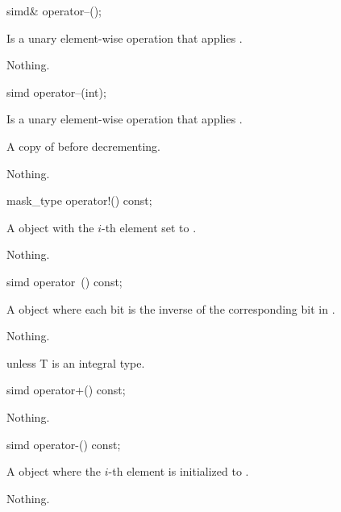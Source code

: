 \begin{itemdecl}
simd& operator--();
\end{itemdecl}
\begin{itemdescr}
  \pnum\effects Is a unary element-wise operation that applies .

  \pnum\returns {}

  \pnum\throws Nothing.
\end{itemdescr}

\begin{itemdecl}
simd operator--(int);
\end{itemdecl}
\begin{itemdescr}
  \pnum\effects Is a unary element-wise operation that applies .

  \pnum\returns A copy of  before decrementing.

  \pnum\throws Nothing.
\end{itemdescr}

\begin{itemdecl}
mask_type operator!() const;
\end{itemdecl}
\begin{itemdescr}
  \pnum\returns A \mask object with the $i$-th element set to  \foralli.

  \pnum\throws Nothing.
\end{itemdescr}

\begin{itemdecl}
simd operator~() const;
\end{itemdecl}
\begin{itemdescr}
  \pnum\returns A \simd object where each bit is the inverse of the corresponding bit in .

  \pnum\throws Nothing.

  \pnum\remarks \simd{} \specialsfinae unless \type T is an integral type.
\end{itemdescr}

\begin{itemdecl}
simd operator+() const;
\end{itemdecl}
\begin{itemdescr}
  \pnum\returns {}

  \pnum\throws Nothing.
\end{itemdescr}

\begin{itemdecl}
simd operator-() const;
\end{itemdecl}
\begin{itemdescr}
  \pnum\returns A \simd object where the $i$-th element is initialized to  \foralli.

  \pnum\throws Nothing.
\end{itemdescr}

